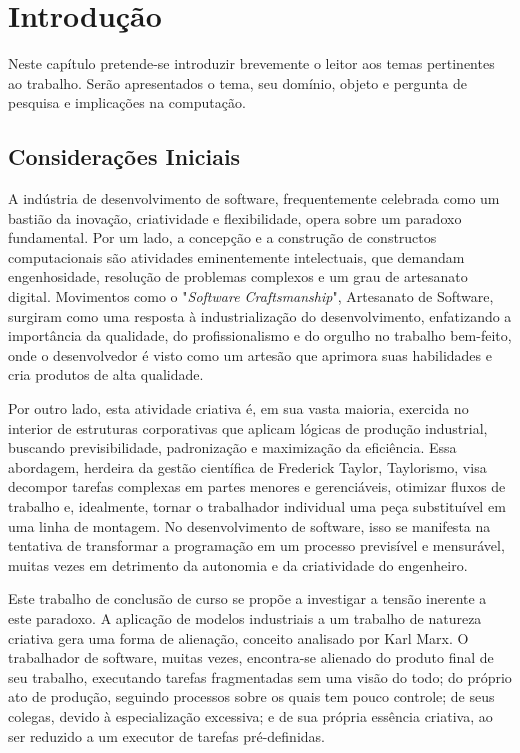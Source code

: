 \chapter{Introdução}\label{cap:introducao}

Neste capítulo pretende-se introduzir brevemente o leitor aos temas pertinentes ao trabalho. Serão apresentados o tema, seu domínio, objeto e pergunta de pesquisa e 
implicações na computação.


\section{Considerações Iniciais}\label{sec:consideracoes_iniciais}

A indústria de desenvolvimento de software, frequentemente celebrada como um bastião da inovação, criatividade e flexibilidade, opera sobre um paradoxo fundamental. Por um lado,
a concepção e a construção de constructos computacionais são atividades eminentemente intelectuais, que demandam engenhosidade, resolução de problemas complexos e um grau de 
artesanato digital. Movimentos como o "\textit{Software Craftsmanship}", Artesanato de Software, surgiram como uma resposta à industrialização do desenvolvimento, enfatizando a 
importância da qualidade, do profissionalismo e do orgulho no trabalho bem-feito, onde o desenvolvedor é visto como um artesão que aprimora suas habilidades e cria produtos de 
alta qualidade.   

Por outro lado, esta atividade criativa é, em sua vasta maioria, exercida no interior de estruturas corporativas que aplicam lógicas de produção industrial, buscando 
previsibilidade, padronização e maximização da eficiência. Essa abordagem, herdeira da gestão científica de Frederick Taylor, Taylorismo, visa decompor tarefas complexas em 
partes menores e gerenciáveis, otimizar fluxos de trabalho e, idealmente, tornar o trabalhador individual uma peça substituível em uma linha de montagem. No desenvolvimento de 
software, isso se manifesta na tentativa de transformar a programação em um processo previsível e mensurável, muitas vezes em detrimento da autonomia e da criatividade do 
engenheiro.   

Este trabalho de conclusão de curso se propõe a investigar a tensão inerente a este paradoxo. A aplicação de modelos industriais a um trabalho de natureza criativa gera uma 
forma de alienação, conceito analisado por Karl Marx. O trabalhador de software, muitas vezes, encontra-se alienado do produto final de seu trabalho, executando tarefas 
fragmentadas sem uma visão do todo; do próprio ato de produção, seguindo processos sobre os quais tem pouco controle; de seus colegas, devido à especialização excessiva; e de 
sua própria essência criativa, ao ser reduzido a um executor de tarefas pré-definidas.   

